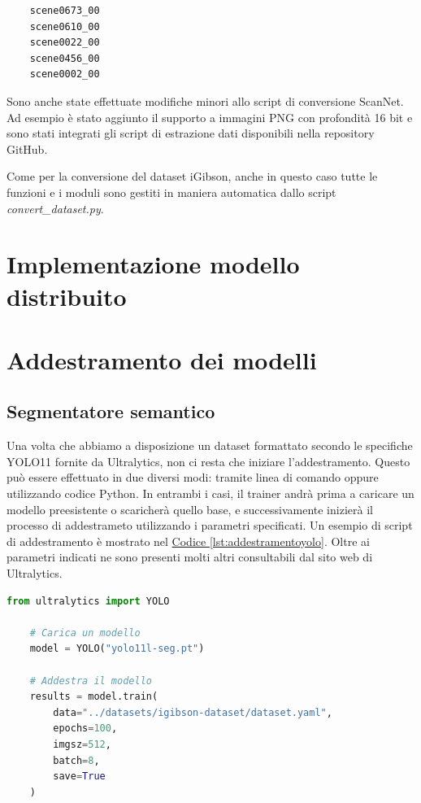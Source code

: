 \documentclass[12pt]{report}
\begin{document}
\begin{verbatim}
	scene0673_00
	scene0610_00
	scene0022_00
	scene0456_00
	scene0002_00
\end{verbatim}

Sono anche state effettuate modifiche minori allo script di conversione ScanNet. Ad esempio è stato aggiunto il supporto a immagini PNG con profondità 16 bit e sono stati integrati gli script di estrazione dati disponibili nella repository GitHub.

Come per la conversione del dataset iGibson, anche in questo caso tutte le funzioni e i moduli sono gestiti in maniera automatica dallo script \textit{convert\_dataset.py}.

\section{Implementazione modello distribuito}
\label{sec:implementazione_modello_per_fog_robotics}


\section{Addestramento dei modelli}
\label{sec:addestramento_dei modelli}

\subsection{Segmentatore semantico}
\label{sec:addestramento_segmentatore_semantico}

Una volta che abbiamo a disposizione un dataset formattato secondo le specifiche YOLO11 fornite da Ultralytics, non ci resta che iniziare l'addestramento. Questo può essere effettuato in due diversi modi: tramite linea di comando oppure utilizzando codice Python. In entrambi i casi, il trainer andrà prima a caricare un modello preesistente o scaricherà quello base, e successivamente inizierà il processo di addestrameto utilizzando i parametri specificati. Un esempio di script di addestramento è mostrato nel \hyperref[lst:addestramentoyolo]{Codice \ref{lst:addestramentoyolo}}. Oltre ai parametri indicati ne sono presenti molti altri consultabili dal sito web di Ultralytics.

\lstset{style=pythonstyle}
\begin{lstlisting}[language=Python, caption={Un esempio di codice Python per addestrare un modello YOLO11}, label={lst:addestramentoyolo}, float]
	from ultralytics import YOLO
	
	# Carica un modello
	model = YOLO("yolo11l-seg.pt")
	
	# Addestra il modello
	results = model.train(
		data="../datasets/igibson-dataset/dataset.yaml",
		epochs=100,
		imgsz=512,
		batch=8,
		save=True
	)
\end{lstlisting}
\end{document}

